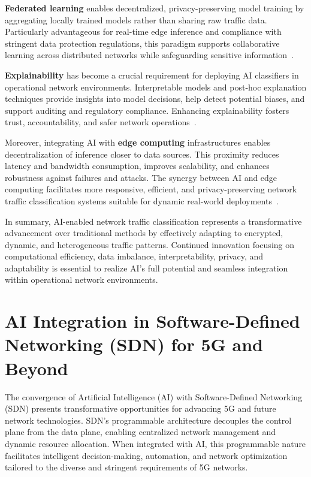 \documentclass[sigconf]{acmart}
\begin{document}
\textbf{Federated learning} enables decentralized, privacy-preserving model training by aggregating locally trained models rather than sharing raw traffic data. Particularly advantageous for real-time edge inference and compliance with stringent data protection regulations, this paradigm supports collaborative learning across distributed networks while safeguarding sensitive information~\cite{ref49,ref50,ref51}.

\textbf{Explainability} has become a crucial requirement for deploying AI classifiers in operational network environments. Interpretable models and post-hoc explanation techniques provide insights into model decisions, help detect potential biases, and support auditing and regulatory compliance. Enhancing explainability fosters trust, accountability, and safer network operations~\cite{ref50,ref51}.

Moreover, integrating AI with \textbf{edge computing} infrastructures enables decentralization of inference closer to data sources. This proximity reduces latency and bandwidth consumption, improves scalability, and enhances robustness against failures and attacks. The synergy between AI and edge computing facilitates more responsive, efficient, and privacy-preserving network traffic classification systems suitable for dynamic real-world deployments~\cite{ref49,ref51}.

In summary, AI-enabled network traffic classification represents a transformative advancement over traditional methods by effectively adapting to encrypted, dynamic, and heterogeneous traffic patterns. Continued innovation focusing on computational efficiency, data imbalance, interpretability, privacy, and adaptability is essential to realize AI’s full potential and seamless integration within operational network environments.

\section{AI Integration in Software-Defined Networking (SDN) for 5G and Beyond}

The convergence of Artificial Intelligence (AI) with Software-Defined Networking (SDN) presents transformative opportunities for advancing 5G and future network technologies. SDN’s programmable architecture decouples the control plane from the data plane, enabling centralized network management and dynamic resource allocation. When integrated with AI, this programmable nature facilitates intelligent decision-making, automation, and network optimization tailored to the diverse and stringent requirements of 5G networks.
\end{document}
